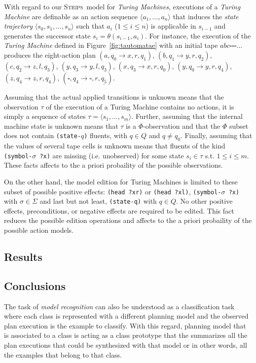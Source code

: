 \documentclass[letterpaper]{article} %
\newcommand{\tup}[1]{{\langle #1 \rangle}}
\newcommand{\strips}{\textsc{Strips}}     %
\begin{document}
With regard to our \strips\ model for {\em Turing Machines}, executions of a {\em Turing Machine} are definable as an action sequence $\tup{a_1, \ldots, a_n}$ that induces the {\em state trajectory} $\tup{s_0, s_1, \ldots, s_n}$ such that $a_i$ ({\small $1\leq i\leq n$}) is applicable in $s_{i-1}$ and generates the successor state $s_i=\theta(s_{i-1},a_i)$. For instance, the execution of the {\em Turing Machine} defined in Figure~\ref{fig:tautomatae} with an initial tape $abc\square\square\square\ldots$ produces the eight-action plan {\small $(a,q_0\rightarrow x,r,q_1)$, $(b,q_1\rightarrow y,r,q_2)$, $(c,q_2\rightarrow z,l,q_3)$, $(y,q_3\rightarrow y,l,q_3)$, $(x,q_3\rightarrow x,r,q_0)$, $(y,q_0\rightarrow y,r,q_4)$, $(z,q_4\rightarrow z,r,q_4)$, $(\square,q_4\rightarrow \square,r,\underline{q_5})$}.

Assuming that the actual applied transitions is unknown means that the observation $\tau$ of the execution of a Turing Machine contains no actions, it is simply a sequence of states $\tau=\tup{s_1, \ldots , s_m}$. Further, assuming that the internal machine state is unknown means that $\tau$ is a $\Phi$-observation and that the $\Phi$ subset does not contain {\small\tt (state-$q$)} fluents, with $q\in Q$ and $q\neq q_0$. Finally, assuming that the values of several tape cells is unknown means that fluents of the kind {\small\tt (symbol-$\sigma$ ?x)} are missing (i.e. unobserved) for some state $s_i\in \tau$ s.t. $1\leq i\leq m$. These facts affects to the a priori probaility of the possible observations.

On the other hand, the model edition for Turing Machines is limited to these subset of possible positive effects: {\tt (head ?xr)} or {\tt (head ?xl)}, {\tt(symbol-$\sigma$ ?x)} with $\sigma \in \Sigma$ and last but not least, {\tt (state-q)} with $q\in Q$. No other positive effects, preconditions, or negative effects are required to be edited. This fact reduces the possible edition operations and affects to the a priori probaility of the possible action models.

\subsection{Results}

\subsection{Conclusions}
\label{sec:conclussions}
The task of {\em model recognition} can also be understood as a classification task where each class is represented with a different planning model and the observed plan execution is the example to classify. With this regard, planning model that is associated to a class is acting as a class prototype that the summarizes all the plan executions that could be synthesized with that model or in other words, all the examples that belong to that class.
\end{document}
